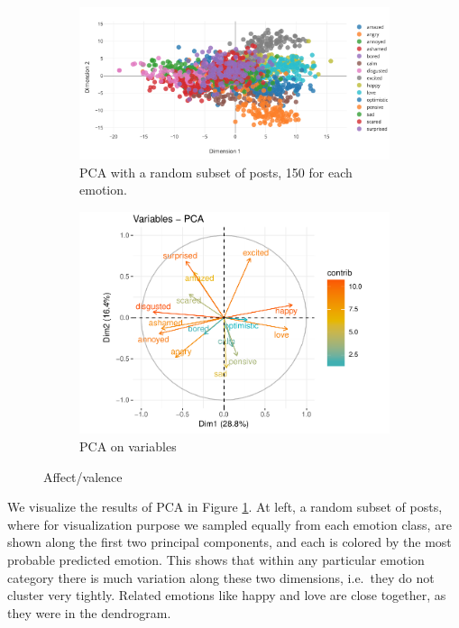 \documentclass{article} %
\begin{document}
\begin{figure}[H]
    \begin{subfigure}[t]{.5\textwidth}
        \vskip 0pt %
        \centering
        \includegraphics[width=\linewidth]{Images/PCA_1vs2.png}
        \caption{PCA with a random subset of posts, 150 for each emotion.}
   \end{subfigure}
   \begin{subfigure}[t]{.5\textwidth}
       \vskip 0pt
       \centering
       \includegraphics[width=\linewidth]{Images/variables_pca_1vs2.pdf}
       \caption{PCA on variables}
    \end{subfigure}
    \caption{Affect/valence}
    \label{affect-valence}
\end{figure}
We visualize the results of PCA in Figure \ref{affect-valence}.
At left, a random subset of posts, where for visualization purpose we sampled equally from each emotion class, are shown along the first two principal components, and each is colored by the most probable predicted emotion. This shows that within any particular emotion category there is much variation along these two dimensions, i.e.~they do not cluster very tightly. Related emotions like happy and love are close together, as they were in the dendrogram. 
\end{document}
